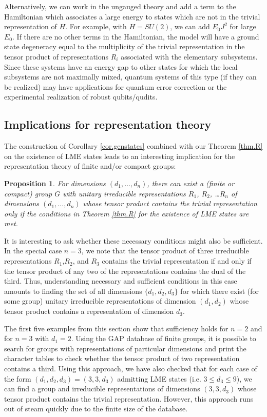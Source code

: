 \documentclass[12pt]{article}
\newtheorem{proposition}[theorem]{Proposition}
\theoremstyle{definition}
\begin{document}
Alternatively, we can work in the ungauged theory and add a term to the Hamiltonian which associates a large energy to states which are not in the trivial representation of $H$. For example, with $H = SU(2)$, we can add $E_0 J^2$ for large $E_0$. If there are no other terms in the Hamiltonian, the model will have a ground state degeneracy equal to the multiplicity of the trivial representation in the tensor product of representations $R_i$ associated with the elementary subsystems. Since these systems  have an energy gap to other states for which the local subsystems are not maximally mixed, quantum systems of this type (if they can be realized) may have applications for quantum error correction or the experimental realization of robust qubits/qudits.

\subsection{Implications for representation theory}

The construction of Corollary \ref{cor.genstates} combined with our Theorem \ref{thm.R} on the existence of LME states leads to an interesting implication for the representation theory of finite and/or compact groups:
\begin{proposition}
For dimensions $(d_1, \dots, d_n)$, there can exist a (finite or compact) group $G$ with unitary irreducible representations $R_1$, $R_2$, \dots $R_n$  of dimensions $(d_1, \dots, d_n)$ whose tensor product contains the trivial representation only if the conditions in Theorem \ref{thm.R} for the existence of LME states are met.
\end{proposition}
It is interesting to ask whether these necessary conditions might also be sufficient. In the special case $n=3$, we note that the tensor product of three irreducible representations $R_1$,$R_2$, and $R_3$ contains the trivial representation if and only if the tensor product of any two of the representations contains the dual of the third. Thus, understanding necessary and sufficient conditions in this case amounts to finding the set of all dimensions $\{d_1, d_2, d_3\}$ for which there exist (for some group) unitary irreducible representations  of dimension $(d_1,d_2)$ whose tensor product contains a representation of dimension $d_3$.

The first five examples from this section show that sufficiency holds for $n=2$ and for $n=3$ with $d_1 = 2$. Using the GAP database of finite groups, it is possible to search for groups with representations of particular dimensions and print the character tables to check whether the tensor product of two representation contains a third. Using this approach, we have also checked that for each case of the form $(d_1,d_2,d_3) = (3,3,d_3)$ admitting LME states (i.e. $3 \le d_3 \le 9$), we can find a group and irreducible representations of dimensions $(3,3,d_3)$ whose tensor product contains the trivial representation. However, this approach runs out of steam quickly due to the finite size of the database.
\end{document}
